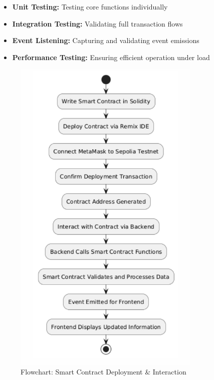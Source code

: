 \begin{itemize}
    \item \textbf{Unit Testing:} Testing core functions individually
    \item \textbf{Integration Testing:} Validating full transaction flows
    \item \textbf{Event Listening:} Capturing and validating event emissions
    \item \textbf{Performance Testing:} Ensuring efficient operation under load
\end{itemize}
\newpage
\begin{figure}[htbp]
  \centering
  \includegraphics[width=0.8\textwidth]{images/contract_flowchart.png}
  \caption{Flowchart: Smart Contract Deployment \& Interaction}
  \label{fig:contract-flowchart}
\end{figure}
